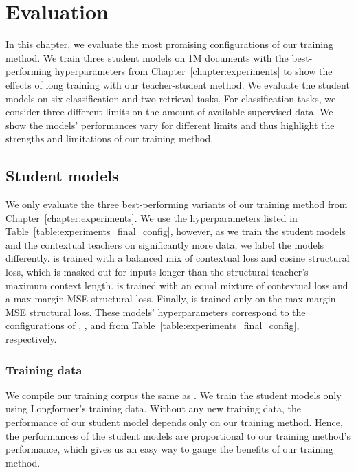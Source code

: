 \chapter{Evaluation}\label{chapter:evaluation}

In this chapter, we evaluate the most promising configurations of our training
method. We train three student models on 1M documents with the best-performing
hyperparameters from Chapter~\ref{chapter:experiments} to show the effects of
long training with our teacher-student method. We evaluate the student models
on six classification and two retrieval tasks. For classification tasks, we
consider three different limits on the amount of available supervised data. We
show the models' performances vary for different limits and thus highlight
the strengths and limitations of our training method.

\section{Student models}

We only evaluate the three best-performing variants of our training method from
Chapter~\ref{chapter:experiments}. We use the hyperparameters listed in
Table~\ref{table:experiments_final_config}, however, as we train the student
models and the contextual teachers on significantly more data, we label the
models differently. {\CosineStudent} is trained with a balanced mix of
contextual loss and cosine structural loss, which is masked out for inputs
longer than the structural teacher's maximum context length. {\MSEStudent} is
trained with an equal mixture of contextual loss and a max-margin MSE
structural loss. Finally, {\OnlyMSEStudent} is trained only on the max-margin
MSE structural loss. These models' hyperparameters correspond to the
configurations of ,
, and  from
Table~\ref{table:experiments_final_config}, respectively.

\subsection{Training data}

We compile our training corpus the same as . We train the
student models only using Longformer's training data. Without any new training
data, the performance of our student model depends only on our training method.
Hence, the performances of the student models are proportional to our training
method's performance, which gives us an easy way to gauge the benefits of our
training method.

